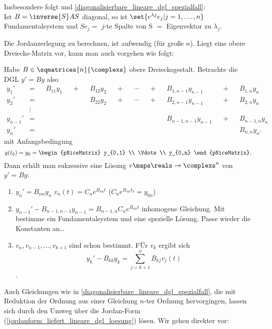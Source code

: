 \begin{bemerkung*}
  Insbesondere folgt  und \ref{diagonalisierbare_lineare_dgl_spezialfall}:\\
  Ist \( B=\inverse{S}AS \) diagonal, so ist \( \set{e^{\lambda j} e_j|j=1,\dotsc, n} \) Fundamentalsystem und \( S e_j= \) \( j \)-te Spalte von S \( = \) Eigenvektor zu \( \lambda_j \).

  Die Jordanzerlegung zu berechnen, ist aufwendig (für große \( n \)). Liegt eine obere Dreiecks-Matrix vor, kann man auch vorgehen wie folgt:
\end{bemerkung*}
\begin{bemerkung}
  Habe \( B\in \sqmatrices{n}{\complexs} \) obere Dreiecksgestalt. Betrachte die DGL \( y'=By \) also
  \begin{align*}
    y_1'&=&&B_{11}y_1&&+&&B_{12}y_2&&+&&\dotsb&&+&&B_{1,n-1}y_{n-1}&&+&&B_{1,n}y_n\\
    y_2'&=&&&&&&B_{22}y_2&&+&&\dotsb&&+&&B_{2,n-1}y_{n-1}&&+&&B_{2,n}y_n\\
    &\vdots\\
    y_{n-1}'&=&&&&&&&&&&&&&&B_{n-1,n-1}y_{n-1}&&+&&B_{n-1,n}y_n\\
    y_n'&=&&&&&&&&&&&&&&&&&&B_{n,n}y_n.
  \end{align*}
  mit Anfangsbedingung
  \begin{equation*}
    y(t_0)=y_0=\begin{pNiceMatrix} y_{0,1} \\ \Vdots \\ y_{0,n} \end{pNiceMatrix}.
  \end{equation*}
  Dann erhält man sukzessive eine Lösung \( v\maps \reals\to \complexs^n \) von \( y'=By \):
  \begin{enumerate}[label=\rechtsklammer{\arabic*}]
    \item \( y_n'=B_{nn}y_n \) \timplies \( v_n(t)=C_n e^{B_{nn}t} \) (\( C_n e^{B_{nn}t_0}=y_{0n} \))
    \item \( y_{n-1}'-B_{n-1,n-1}y_{n-1}=B_{n-1,n}C_n e^{B_{nn}t} \) inhomogene Gleichung. Mit  bestimme ein Fundamentalsystem und eine spezielle Lösung. Passe wieder die Konstanten an\dots
    \item[\rechtsklammer{k}] \( v_n, v_{n-1},\dotsc, v_{k+1} \) sind schon bestimmt. FÜr \( v_k \) ergibt sich
    \begin{equation*}
      y_k'-B_{kk}y_k=\sum_{j=k+1}^{n}B_{kj}v_j(t)
    \end{equation*}
    \usf.
  \end{enumerate}
  Auch Gleichungen wie in \ref{diagonalisierbare_lineare_dgl_spezialfall}, die mit Reduktion der Ordnung aus einer Gleichung \( n \)-ter Ordnung hervorgingen, lassen sich durch den Umweg über die Jordan-Form (\ref{jordanform_liefert_lineare_dgl_loesung}) lösen. Wir gehen direkter vor:
\end{bemerkung}

